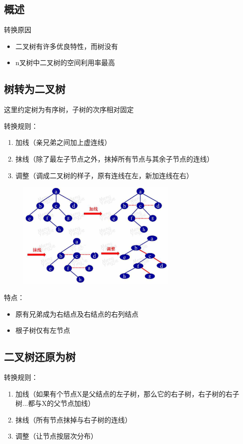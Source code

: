 \documentclass[AutoFakeBold]{LZUThesis2007}
\begin{document}
		\subsection{概述}
		转换原因
		\begin{itemize}
			\item 二叉树有许多优良特性，而树没有
			\item n叉树中二叉树的空间利用率最高
		\end{itemize}
		\subsection{树转为二叉树}
		这里约定树为有序树，子树的次序相对固定

		转换规则：
		\begin{enumerate}
			\item 加线（亲兄弟之间加上虚连线）
			\item 抹线（除了最左子节点之外，抹掉所有节点与其余子节点的连线）
			\item 调整（调成二叉树的样子，原有连线在左，新加连线在右）
		\end{enumerate}
		\begin{figure}[H]
		    \centering
		    \includegraphics[width=0.7\textwidth]{figures/7.3.png}
		    
		    \label{fig_install_texlive}
		\end{figure}
		特点：
		\begin{itemize}
			\item 原有兄弟成为右结点及右结点的右列结点
			\item 根子树仅有左节点
		\end{itemize}

		\subsection{二叉树还原为树}
		转换规则：
		\begin{enumerate}
			\item 加线（如果有个节点X是父结点的左子树，那么它的右子树，右子树的右子树...都与X的父节点加线）
			\item 抹线（所有节点抹掉与右子树的连线）
			\item 调整（让节点按层次分布）
		\end{enumerate}
\end{document}
